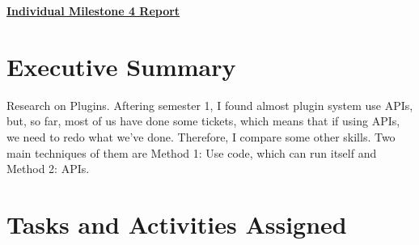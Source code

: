 \documentclass{article}
\begin{document}
\pagestyle{headings}

\begin{center}
{\LARGE\textbf{\underline{{Individual Milestone 4 Report}}}}
\end{center}

\section*{Executive Summary}

Research on Plugins. Aftering semester 1, I found almost plugin system use APIs, but, so far, most of us have done some tickets, which means that if using APIs, we need to redo what we've done. Therefore, I compare some other skills. Two main techniques of them are Method 1: Use code, which can run itself and Method 2: APIs.

\section*{Tasks and Activities Assigned}
\end{document}
